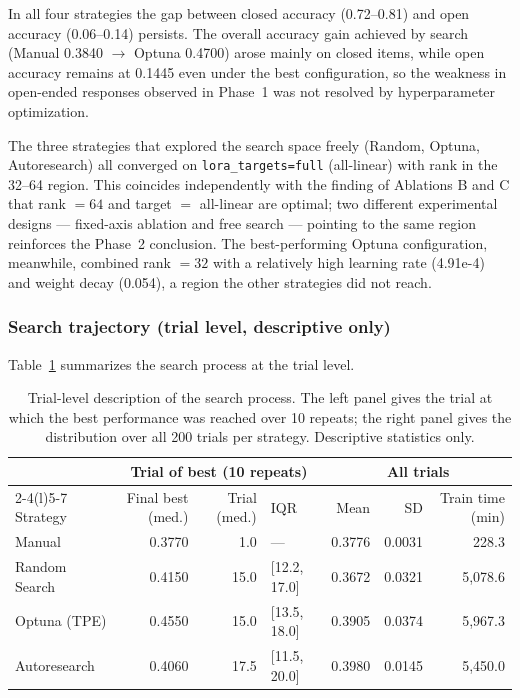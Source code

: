 In all four strategies the gap between closed accuracy (0.72--0.81) and open
accuracy (0.06--0.14) persists. The overall accuracy gain achieved by search
(Manual 0.3840 $\rightarrow$ Optuna 0.4700) arose mainly on closed items, while
open accuracy remains at 0.1445 even under the best configuration, so the
weakness in open-ended responses observed in Phase~1 was not resolved by
hyperparameter optimization.

The three strategies that explored the search space freely (Random, Optuna,
Autoresearch) all converged on \texttt{lora\_targets=full} (all-linear) with rank
in the 32--64 region. This coincides independently with the finding of Ablations
B and C that rank $=64$ and target $=$ all-linear are optimal; two different
experimental designs --- fixed-axis ablation and free search --- pointing to the
same region reinforces the Phase~2 conclusion. The best-performing Optuna
configuration, meanwhile, combined rank $=32$ with a relatively high learning
rate (4.91e-4) and weight decay (0.054), a region the other strategies did not
reach.

\subsubsection{Search trajectory (trial level, descriptive only)}
\label{sec:res-traj}

Table~\ref{tab:phase3trial} summarizes the search process at the trial level.

\begin{table}[t]
\centering
\caption{Trial-level description of the search process. The left panel gives the
trial at which the best performance was reached over 10 repeats; the right panel
gives the distribution over all 200 trials per strategy. Descriptive statistics
only.}
\label{tab:phase3trial}
\small
\begin{tabular}{@{}lrrl@{\hspace{2em}}rrr@{}}
\toprule
& \multicolumn{3}{c}{Trial of best (10 repeats)} & \multicolumn{3}{c}{All trials} \\
\cmidrule(r){2-4}\cmidrule(l){5-7}
Strategy & Final best (med.) & Trial (med.) & IQR & Mean & SD & Train time (min) \\
\midrule
Manual        & 0.3770 & 1.0  & ---           & 0.3776 & 0.0031 & 228.3 \\
Random Search & 0.4150 & 15.0 & [12.2, 17.0]  & 0.3672 & 0.0321 & 5,078.6 \\
Optuna (TPE)  & 0.4550 & 15.0 & [13.5, 18.0]  & 0.3905 & 0.0374 & 5,967.3 \\
Autoresearch  & 0.4060 & 17.5 & [11.5, 20.0]  & 0.3980 & 0.0145 & 5,450.0 \\
\bottomrule
\end{tabular}
\end{table}

